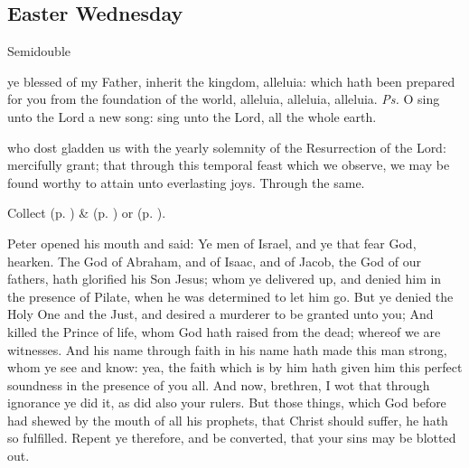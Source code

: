 \subsection{Easter Wednesday}
\begin{inhead}
    {Semidouble}
\end{inhead}


\introit
{} ye blessed of my Father, inherit the kingdom, alleluia: which hath been prepared for you from the foundation of the world, alleluia, alleluia, alleluia. \textit{Ps.} O sing unto the Lord a new song: sing unto the Lord, all the whole earth.

\collect
{} who dost gladden us with the yearly solemnity of the Resurrection of the Lord: mercifully grant; that through this temporal feast which we observe, we may be found worthy to attain unto everlasting joys. Through the same.
\begin{rubric}
     Collect  (p. \pageref{EasterCollect}) \&   (p. \pageref{SPAgainst}) or  (p. \pageref{SPChiefBishop}).
\end{rubric}

\clearpage
{}
 Peter opened his mouth and said: Ye men of Israel, and ye that fear God, hearken. The God of Abraham, and of Isaac, and of Jacob, the God of our fathers, hath glorified his Son Jesus; whom ye delivered up, and denied him in the presence of Pilate, when he was determined to let him go. But ye denied the Holy One and the Just, and desired a murderer to be granted unto you; And killed the Prince of life, whom God hath raised from the dead; whereof we are witnesses. And his name through faith in his name hath made this man strong, whom ye see and know: yea, the faith which is by him hath given him this perfect soundness in the presence of you all. And now, brethren, I wot that through ignorance ye did it, as did also your rulers. But those things, which God before had shewed by the mouth of all his prophets, that Christ should suffer, he hath so fulfilled. Repent ye therefore, and be converted, that your sins may be blotted out.


